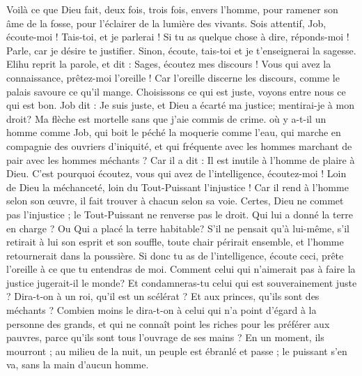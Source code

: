 \begin{multicols}{2}
Voilà ce que Dieu fait, deux fois, trois fois, envers l'homme,
pour ramener son âme de la fosse, pour l'éclairer de la lumière des vivants.
Sois attentif, Job, écoute-moi ! Tais-toi, et je parlerai !
Si tu as quelque chose à dire, réponds-moi ! Parle, car je désire te justifier.
Sinon, écoute, tais-toi et je t'enseignerai la sagesse.
\VerseOne{}Elihu reprit la parole, et dit :
Sages, écoutez mes discours ! Vous qui avez la connaissance, prêtez-moi l'oreille !
Car l'oreille discerne les discours, comme le palais savoure ce qu'il mange.
Choisissons ce qui est juste, voyons entre nous ce qui est bon.
Job dit : Je suis juste, et Dieu a écarté ma justice;
mentirai-je à mon droit? Ma flèche est mortelle sans que j'aie commis de crime.
où y a-t-il un homme comme Job, qui boit le péché la moquerie comme l'eau,
qui marche en compagnie des ouvriers d'iniquité, et qui fréquente  avec les hommes marchant de pair avec les hommes méchants ?
Car il a dit : Il est inutile à l'homme de plaire à Dieu.
 C'est pourquoi écoutez, vous qui avez de l'intelligence, écoutez-moi ! Loin de Dieu la méchanceté, loin du Tout-Puissant l'injustice !
Car il rend à l'homme selon son œuvre, il fait trouver à chacun selon sa voie.
Certes, Dieu ne commet pas l'injustice ; le Tout-Puissant ne renverse pas le droit.
Qui lui a donné la terre en charge ? Ou Qui a placé la terre habitable?
S'il ne pensait qu'à lui-même, s'il retirait à lui son esprit et son souffle,
toute chair périrait ensemble, et l'homme retournerait dans la poussière.
Si donc tu as de l'intelligence, écoute ceci, prête l'oreille à ce que tu entendras de moi.
Comment celui qui n'aimerait pas à faire la justice jugerait-il le monde? Et condamneras-tu celui qui est souverainement juste ?
Dira-t-on à un roi, qu'il est un scélérat ? Et aux princes, qu'ils sont des méchants ?
Combien moins le dira-t-on à celui qui n'a point d'égard à la personne des grands, et qui ne connaît point les riches pour les préférer aux pauvres, parce qu'ils sont tous l'ouvrage de ses mains ?
En un moment, ils mourront ; au milieu de la nuit, un peuple est ébranlé et passe ; le puissant s'en va, sans la main d'aucun homme.

\end{multicols}
